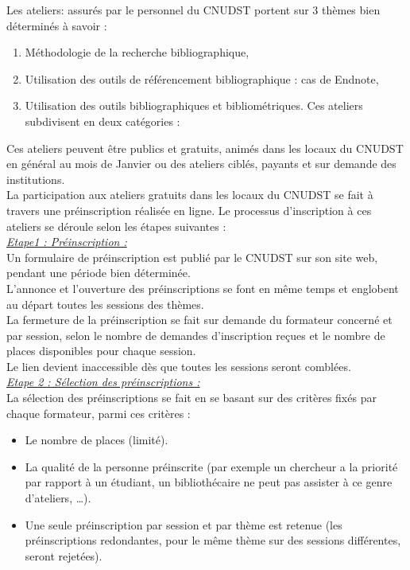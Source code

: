 Les ateliers: assurés par le personnel du CNUDST portent sur 3 thèmes bien
déterminés à savoir :
\begin{enumerate}
	\item Méthodologie de la recherche bibliographique,
	\item Utilisation des outils de référencement bibliographique : cas de Endnote,
	\item Utilisation des outils bibliographiques et bibliométriques.
	Ces ateliers subdivisent en deux catégories : 
	
\end{enumerate}
Ces ateliers peuvent être publics et gratuits, animés dans les locaux du CNUDST en général au mois de Janvier ou des ateliers ciblés, payants et sur demande des
institutions.\\
La participation aux ateliers gratuits dans les locaux du CNUDST se fait à travers
une préinscription réalisée en ligne. Le processus d’inscription à
ces ateliers se déroule selon les étapes suivantes :
\\
\underline{\textit{Etape1 : Préinscription :}}\\
Un formulaire de préinscription est publié par le CNUDST sur son site
web, pendant une période bien déterminée.\\
L’annonce et l’ouverture des préinscriptions se font en même temps et englobent au
départ toutes les sessions des thèmes.\\
La fermeture de la préinscription se fait sur demande du formateur concerné et
par session, selon le nombre de demandes d’inscription reçues et le nombre de
places disponibles pour chaque session.\\
Le lien devient inaccessible dès que toutes les sessions seront comblées.\\ 
\underline{\textit{Etape 2 : Sélection des préinscriptions :}}\\
La sélection des préinscriptions se fait en se basant sur des critères fixés par
chaque formateur, parmi ces critères :
\begin{itemize}
	\item Le nombre de places (limité).
	\item La qualité de la personne préinscrite (par exemple un chercheur a la
	priorité par rapport à un étudiant, un bibliothécaire ne peut pas assister à
	ce genre d'ateliers, …).
	\item Une seule préinscription par session et par thème est retenue (les
	préinscriptions redondantes, pour le même thème sur des sessions
	différentes, seront rejetées).
\end{itemize}
